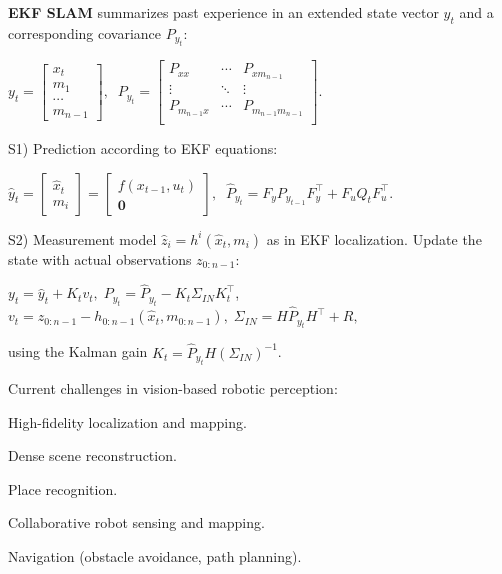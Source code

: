 \documentclass[landscape]{article}
\newcommand{\vmspace}{\vspace{-7pt}}
\newcommand{\vpspace}{\vspace{5pt}}
\begin{document}
\begin{multicols}{3}
\begin{minipage}{\columnwidth}
  \textbf{EKF SLAM} summarizes past experience in an extended state vector $y_t$
  and a corresponding covariance $P_{y_t}$:
  \vmspace
  \begin{center}
    $
    y_t
    =
    \left[
    \begin{matrix}
      x_t \\
      m_1 \\
      \cdots \\
      m_{n-1}
    \end{matrix}
    \right],\;\;
    P_{y_t}
    =
    \left[
    \begin{matrix}
      P_{xx} & \cdots & P_{xm_{n-1}} \\
      \vdots & \ddots & \vdots \\
      P_{m_{n-1}x} & \cdots & P_{m_{n-1}m_{n-1}} \\
    \end{matrix}
    \right]
    $.
  \end{center}
  \vmspace
  S1) Prediction according to EKF equations:
  \vmspace
  \begin{center}
    $
    \hat y_t
    =
    \left[
    \begin{matrix}
      \hat x_t \\
      m_i
    \end{matrix}
    \right]
    =
    \left[
    \begin{matrix}
      f(x_{t-1}, u_t) \\
      \mathbf 0
    \end{matrix}
    \right],\;\;
    \hat P_{y_t}
    =
    F_yP_{y_{t-1}}F_y^\intercal + F_uQ_tF_u^\intercal.
    $
  \end{center}
  \vmspace
  S2) Measurement model $\hat z_i=h^i(\hat x_t, m_i)$ as in EKF localization.
  Update the state with actual observations $z_{0:n-1}$:
  \vmspace
  \begin{center}
    $
    y_t
    =
    \hat y_t + K_t v_t,\;
    P_{y_t} = \hat P_{y_t} - K_t\Sigma_{IN}K_t^\intercal$,\\
    $
    v_t=z_{0:n-1} - h_{0:n-1}(\hat x_t, m_{0:n-1}),\;
    \Sigma_{IN} = H\hat P_{y_t}H^\intercal + R,\;
    $
  \end{center}
  \vmspace
  using the Kalman gain $K_t = \hat P_{y_t}H(\Sigma_{IN})^{-1}$.
\end{minipage}

\vpspace

\begin{minipage}{\columnwidth}
  Current challenges in vision-based robotic perception:
  \begin{compactenum}
  \item High-fidelity localization and mapping.
  \item Dense scene reconstruction.
  \item Place recognition.
  \item Collaborative robot sensing and mapping.
  \item Navigation (obstacle avoidance, path planning).
  \end{compactenum}
\end{minipage}


\end{multicols}
\end{document}
